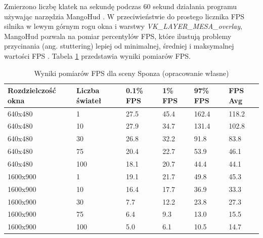 Zmierzono liczbę klatek na sekundę podczas $60$ sekund działania programu używając narzędzia MangoHud \cite{MANGOHUD}.
W przeciwieństwie do prostego licznika FPS silnika w lewym górnym rogu okna i warstwy \textit{VK\_LAYER\_MESA\_overlay}, MangoHud pozwala na pomiar percentylów FPS, które ilustują problemy przycinania (ang. stuttering) lepiej od minimalnej, średniej i maksymalnej wartości FPS \cite{NVSTUTTER}.
Tabela \ref{results_fps} przedstawia wyniki pomiarów FPS.
\begin{table}[!ht]
	\centering
	\begin{tabular}{ |p{2cm}|p{1.1cm}||p{0.7cm}|p{0.7cm}|p{0.7cm}|p{0.7cm}|}
		\hline
		Rozdzielczość okna & Liczba świateł & 0.1\% FPS & 1\% FPS & 97\% FPS  & FPS Avg \\
		\hline \hline
		640x480 & 1 & 27.5  & 45.4 & 162.4 & 118.2 \\
		\hline 
		640x480 & 10 & 27.9 & 34.7 & 131.4 & 102.8 \\
		\hline 
		640x480 & 30 & 26.8 & 32.2 & 91.8 & 83.8 \\
		\hline 
		640x480 & 75 & 20.4 & 22.7 & 53.9 & 46.1 \\
		\hline 
		640x480 & 100 & 18.1 & 20.7 & 44.4 & 44.1 \\
		\hline 	\hline 
		1600x900 & 1 & 19.1 & 21.7 & 49.8 & 45.3 \\
		\hline 
		1600x900 & 10 & 16.4 & 17.7 & 36.9 & 33.3 \\
		\hline 
		1600x900 & 30 & 7.7 & 12.2 & 23.8 & 27.3 \\
		\hline 
		1600x900 & 75 & 6.4 & 9.3 & 13.0 & 15.5 \\
		\hline 
		1600x900 & 100 & 5.0 & 6.1 & 10.5 & 14.7 \\
		\hline
	\end{tabular}
	\caption{Wyniki pomiarów FPS dla sceny Sponza (opracowanie własne)} 
	\label{results_fps}
\end{table}


